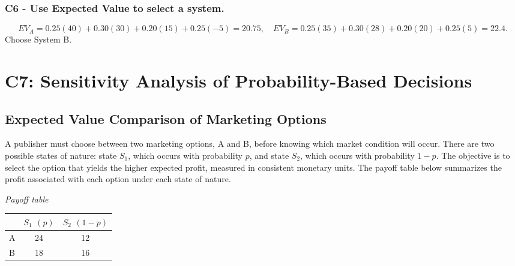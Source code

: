 \subsubsection*{C6 - Use Expected Value to select a system.}
\label{subsec:routing-system-c6}

\[
    EV_A=0.25(40)+0.30(30)+0.20(15)+0.25(-5)=20.75,\quad EV_B=0.25(35)+0.30(28)+0.20(20)+0.25(5)=22.4.
\]
Choose System B.


\section{C7: Sensitivity Analysis of Probability-Based Decisions}
\label{sec:c7-sensitivity-analysis}


\subsection{Expected Value Comparison of Marketing Options}
\label{sec:marketing-options}
    A publisher must choose between two marketing options, A and B, before knowing which market condition will occur.
    There are two possible states of nature: state $S_1$, which occurs with probability $p$, and state $S_2$, which occurs with probability $1-p$.
    The objective is to select the option that yields the higher expected profit, measured in consistent monetary units.
    The payoff table below summarizes the profit associated with each option under each state of nature.
    \begin{center}
        \textit{Payoff table} \\
        \begin{tabular}{l c c}
            \toprule
            & $S_1$ $(p)$ & $S_2$ $(1-p)$ \\
            \midrule
            A & 24 & 12 \\
            B & 18 & 16 \\
            \bottomrule
        \end{tabular}
    \end{center}

